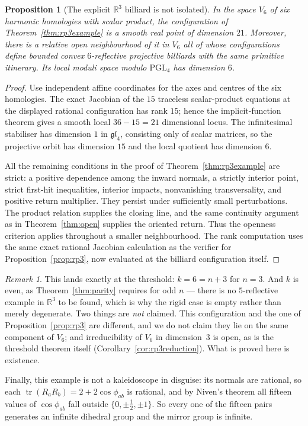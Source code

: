 \documentclass[11pt,a4paper]{article}
\theoremstyle{plain}
\newtheorem{proposition}[theorem]{Proposition}
\theoremstyle{definition}
\theoremstyle{remark}
\newtheorem{remark}[theorem]{Remark}
\newcommand{\PGL}{\mathrm{PGL}}
\begin{document}
\begin{proposition}[The explicit $\mathbb{R}^3$ billiard is not isolated]
\label{prop:rp3localfamily}
In the space $V_6$ of six harmonic homologies with scalar product, the configuration
of Theorem~\ref{thm:rp3example} is a smooth real point of dimension $21$. Moreover,
there is a relative open neighbourhood of it in $V_6$ all of whose configurations
define bounded convex $6$-reflective projective billiards with the same primitive
itinerary. Its local moduli space modulo $\PGL_4$ has dimension $6$.
\end{proposition}

\begin{proof}
Use independent affine coordinates for the axes and centres of the six homologies.
The exact Jacobian of the $15$ traceless scalar-product equations at the displayed
rational configuration has rank $15$; hence the implicit-function theorem gives a
smooth local $36-15=21$ dimensional locus. The infinitesimal stabiliser has
dimension $1$ in $\mathfrak{gl}_4$, consisting only of scalar matrices, so the
projective orbit has dimension $15$ and the local quotient has dimension $6$.

All the remaining conditions in the proof of Theorem~\ref{thm:rp3example} are
strict: a positive dependence among the inward normals, a strictly interior point,
strict first-hit inequalities, interior impacts, nonvanishing transversality, and
positive return multiplier. They persist under sufficiently small perturbations.
The product relation supplies the closing line, and the same continuity argument as
in Theorem~\ref{thm:open} supplies the oriented return. Thus the openness criterion
applies throughout a smaller neighbourhood. The rank computation uses the same
exact rational Jacobian calculation as the verifier for Proposition~\ref{prop:rp3},
now evaluated at the billiard configuration itself.
\end{proof}

\begin{remark}
This lands exactly at the threshold: $k=6=n+3$ for $n=3$. And $k$ is even, as
Theorem~\ref{thm:parity} requires for odd $n$ --- there is no $5$-reflective
example in $\mathbb{R}^3$ to be found, which is why the rigid case is empty rather
than merely degenerate. Two things are \emph{not} claimed. This configuration and
the one of Proposition~\ref{prop:rp3} are different, and we do not claim they lie on
the same component of $V_6$; and irreducibility of $V_6$ in dimension~$3$ is open,
as is the threshold theorem itself (Corollary~\ref{cor:rp3reduction}). What is proved
here is existence.

Finally, this example is not a kaleidoscope in disguise: its normals are rational,
so each $\operatorname{tr}(R_aR_b)=2+2\cos\phi_{ab}$ is rational, and by Niven's theorem all
fifteen values of $\cos\phi_{ab}$ fall outside $\{0,\pm\frac12,\pm1\}$. So every
one of the fifteen pairs generates an infinite dihedral group and the mirror group
is infinite.
\end{remark}
\end{document}
